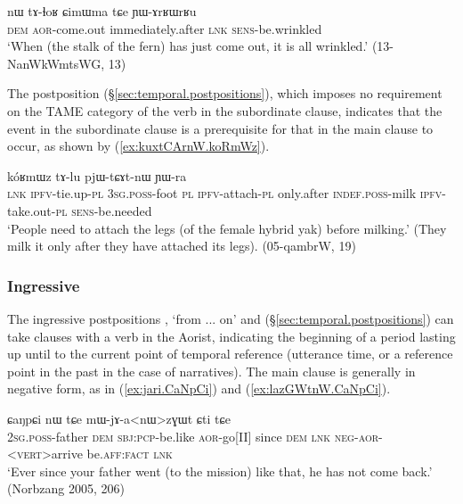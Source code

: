 \begin{exe}
\ex \label{ex:tAlhoR.CimWma} 
\gll  nɯ tɤ-ɬoʁ ɕimɯma tɕe ɲɯ-ɤrʁɯrʁu \\
\textsc{dem} \textsc{aor}-come.out immediately.after \textsc{lnk} \textsc{sens}-be.wrinkled \\
\glt  `When (the stalk of the fern) has just come out, it is all wrinkled.' (13-NanWkWmtsWG, 13)
 \end{exe}  
 
 The postposition   (§\ref{sec:temporal.postpositions}), which imposes no requirement on the TAME category of the verb in the subordinate clause, indicates that the event in the subordinate clause is a prerequisite for that in the main clause to occur, as shown by (\ref{ex:kuxtCArnW.koRmWz}).
 
 \begin{exe}
\ex \label{ex:kuxtCArnW.koRmWz} 
\gll   [ɯ-mi ra ku-xtɕɤr-nɯ] kóʁmɯz tɤ-lu pjɯ-tɕɤt-nɯ ɲɯ-ra \\
 \textsc{lnk} \textsc{ipfv}-tie.up-\textsc{pl} \textsc{3sg}.\textsc{poss}-foot \textsc{pl} \textsc{ipfv}-attach-\textsc{pl} only.after \textsc{indef}.\textsc{poss}-milk \textsc{ipfv}-take.out-\textsc{pl}  \textsc{sens}-be.needed \\
\glt  `People need to attach the legs (of the female hybrid yak) before milking.' (They milk it only after they have attached its legs).   (05-qambrW, 19)
  \end{exe}  
 
 
\subsubsection{Ingressive} \label{sec:since.clause} 
 The ingressive postpositions  , `from ... on' and  (§\ref{sec:temporal.postpositions}) can take clauses with a verb in the Aorist, indicating the beginning of a period lasting up until to the current point of temporal reference (utterance time, or a reference point in the past in the case of narratives). The main clause is generally in negative form, as in (\ref{ex:jari.CaNpCi}) and (\ref{ex:lazGWtnW.CaNpCi}).

\begin{exe}
\ex \label{ex:jari.CaNpCi} 
 ɕaŋpɕi nɯ tɕe mɯ-jɤ-a<nɯ>zɣɯt ɕti tɕe \\
\textsc{2sg}.\textsc{poss}-father \textsc{dem} \textsc{sbj}:\textsc{pcp}-be.like \textsc{aor}-go[II] since \textsc{dem} \textsc{lnk} \textsc{neg}-\textsc{aor}-<\textsc{vert}>arrive be.\textsc{aff}:\textsc{fact} \textsc{lnk} \\
\glt `Ever since your father went (to the mission) like that, he has not come back.' (Norbzang 2005, 206)
\end{exe}  


